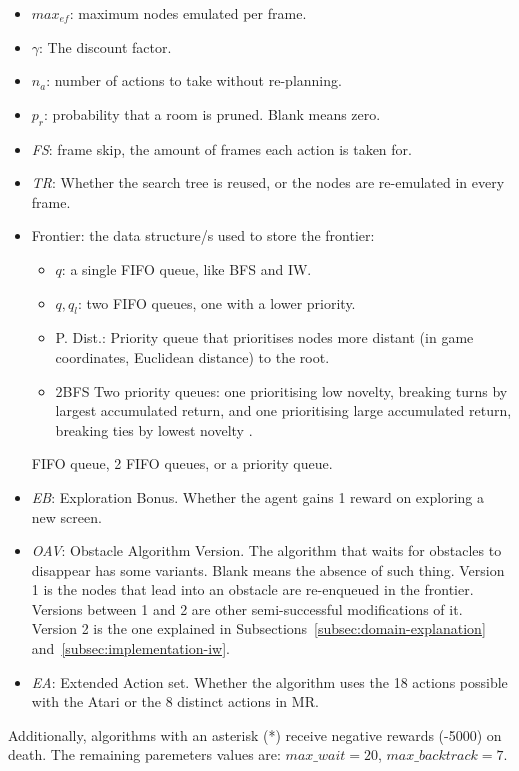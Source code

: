 \begin{itemize}
  \item $max_{ef}$: maximum nodes emulated per frame.
  \item $\gamma$: The discount factor.
  \item $n_a$: number of actions to take without re-planning.
  \item $p_r$: probability that a room is pruned. Blank means zero.
  \item \textit{FS}: frame skip, the amount of frames each action is taken for.
  \item \textit{TR}: Whether the search tree is reused, or the nodes are
    re-emulated in every frame.
  \item Frontier: the data structure/s used to store the frontier:
    \begin{itemize}
      \item $q$: a single \ac{FIFO} queue, like \ac{BFS} and \ac{IW}.
      \item $q,q_l$: two \ac{FIFO} queues, one with a lower priority.
      \item P. Dist.: Priority queue that prioritises nodes more distant (in
        game coordinates, Euclidean distance) to the root.
      \item 2BFS Two priority queues: one prioritising low novelty, breaking
        turns by largest accumulated return, and one prioritising large
accumulated return, breaking ties by lowest novelty \citep{lipovetzky2015classical}.
    \end{itemize}
    \ac{FIFO} queue, 2 \ac{FIFO} queues, or a priority queue.
  \item \textit{EB}: Exploration Bonus. Whether the agent gains 1 reward on
    exploring a new screen.
  \item \textit{OAV}: Obstacle Algorithm Version. The algorithm that waits for
    obstacles to disappear has some variants. Blank means the absence of such
    thing. Version 1 is the nodes that lead into an obstacle are re-enqueued in
    the frontier. Versions between 1 and 2 are other semi-successful
    modifications of it. Version 2 is the one explained in
Subsections~\ref{subsec:domain-explanation} and~\ref{subsec:implementation-iw}.
  \item \textit{EA}: Extended Action set. Whether the algorithm uses the 18
actions possible with the Atari or the 8 distinct actions in \ac{MR}.
\end{itemize}

Additionally, algorithms with an asterisk (*) receive negative rewards (-5000)
on death. The remaining paremeters values are: $max\_wait=20$, $max\_backtrack=7$.

